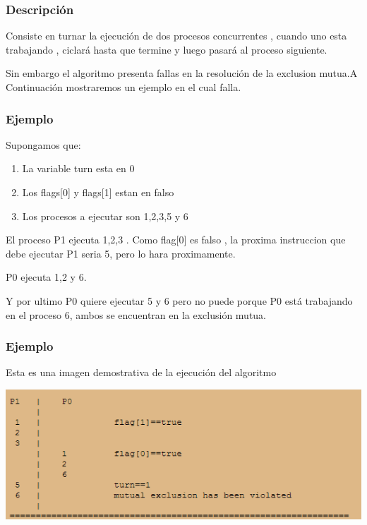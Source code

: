 \documentclass{beamer}
\begin{document}
\begin{frame}
\frametitle{Descripción} 

 Consiste en turnar la ejecución de dos procesos concurrentes , cuando uno esta trabajando , ciclará hasta que termine y luego pasará al proceso siguiente.\par
Sin embargo el algoritmo presenta fallas en la resolución de la exclusion mutua.A Continuación mostraremos un ejemplo en el cual falla.
\end{frame}


\begin{frame}
\frametitle{Ejemplo} 
Supongamos que:
\begin {enumerate}[$*$]
\item La variable turn esta en 0 
\item Los flags[0] y flags[1] estan en falso
\item Los procesos a ejecutar son 1,2,3,5 y 6
\end{enumerate}
 El proceso P1 ejecuta 1,2,3 . Como flag[0] es falso , la proxima instruccion que debe ejecutar P1 seria 5, pero lo hara proximamente.\par
 P0 ejecuta 1,2 y 6.\par
Y por ultimo P0 quiere ejecutar 5 y 6 pero no puede porque P0 está trabajando en el proceso 6, ambos se encuentran en la exclusión mutua.

\end{frame}

\begin{frame}
\frametitle{Ejemplo} 
Esta es una imagen demostrativa de la ejecución del algoritmo \vspace*{0.3cm}

 \includegraphics[width=1\textwidth]{scenario.png}


\end{frame}
\end{document}
